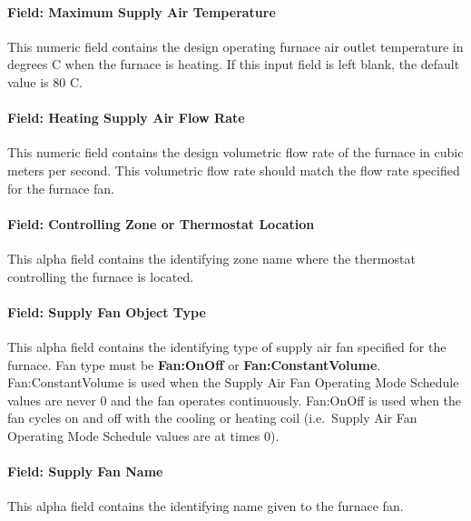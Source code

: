 \paragraph{Field: Maximum Supply Air Temperature}\label{field-maximum-supply-air-temperature-3}

This numeric field contains the design operating furnace air outlet temperature in degrees C when the furnace is heating. If this input field is left blank, the default value is 80 C.

\paragraph{Field: Heating Supply Air Flow Rate}\label{field-heating-supply-air-flow-rate-4-000}

This numeric field contains the design volumetric flow rate of the furnace in cubic meters per second. This volumetric flow rate should match the flow rate specified for the furnace fan.

\paragraph{Field: Controlling Zone or Thermostat Location}\label{field-controlling-zone-or-thermostat-location-5}

This alpha field contains the identifying zone name where the thermostat controlling the furnace is located.

\paragraph{Field: Supply Fan Object Type}\label{field-supply-fan-object-type-3}

This alpha field contains the identifying type of supply air fan specified for the furnace. Fan type must be \textbf{Fan:OnOff} or \textbf{Fan:ConstantVolume}. Fan:ConstantVolume is used when the Supply Air Fan Operating Mode Schedule values are never 0 and the fan operates continuously. Fan:OnOff is used when the fan cycles on and off with the cooling or heating coil (i.e.~Supply Air Fan Operating Mode Schedule values are at times 0).

\paragraph{Field: Supply Fan Name}\label{field-supply-fan-name-3}

This alpha field contains the identifying name given to the furnace fan.


